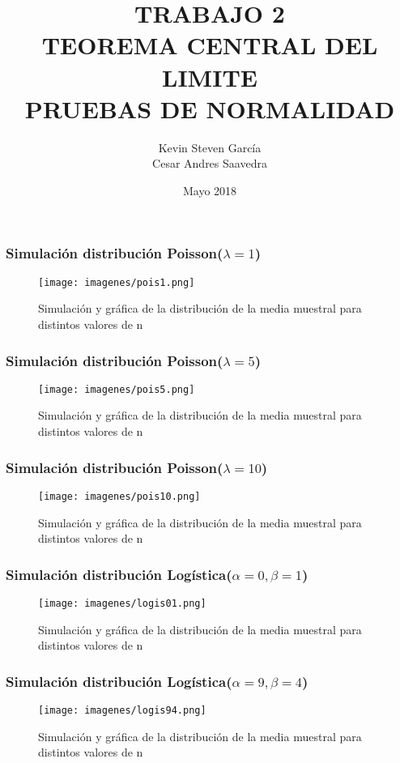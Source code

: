 \documentclass[12pt]{beamer}
\author{Kevin Steven García \\ Cesar Andres Saavedra}
\title{TRABAJO 2 \\ TEOREMA CENTRAL DEL LIMITE \\ PRUEBAS DE NORMALIDAD}
\institute{Universidad del Valle \\ Estadística \\ Simulación Estadística}
\date{Mayo 2018}
\begin{document}
\begin{frame}
\titlepage
\end{frame}




\begin{frame}
\frametitle{Simulación distribución Poisson($\lambda=1$) }
\begin{figure}
\centering
\texttt{[image: imagenes/pois1.png]}
\caption{Simulación y gráfica de la distribución de la media muestral para distintos valores de n}\label{figura2}
\end{figure}
\end{frame}

\begin{frame}
\frametitle{Simulación distribución Poisson($\lambda=5$) }
\begin{figure}
\centering
\texttt{[image: imagenes/pois5.png]}
\caption{Simulación y gráfica de la distribución de la media muestral para distintos valores de n}\label{figura2}
\end{figure}
\end{frame}

\begin{frame}
\frametitle{Simulación distribución Poisson($\lambda=10$) }
\begin{figure}
\centering
\texttt{[image: imagenes/pois10.png]}
\caption{Simulación y gráfica de la distribución de la media muestral para distintos valores de n}\label{figura2}
\end{figure}
\end{frame}

\begin{frame}
\frametitle{Simulación distribución Logística($\alpha=0,\beta=1$) }
\begin{figure}
\centering
\texttt{[image: imagenes/logis01.png]}
\caption{Simulación y gráfica de la distribución de la media muestral para distintos valores de n}\label{figura2}
\end{figure}
\end{frame}

\begin{frame}
\frametitle{Simulación distribución Logística($\alpha=9,\beta=4$) }
\begin{figure}
\centering
\texttt{[image: imagenes/logis94.png]}
\caption{Simulación y gráfica de la distribución de la media muestral para distintos valores de n}\label{figura2}
\end{figure}
\end{frame}
\end{document}
